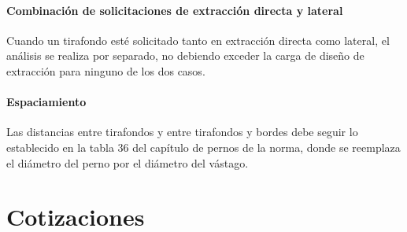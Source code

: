 \subsubsection{Combinación de solicitaciones de extracción directa y lateral}
Cuando un tirafondo esté solicitado tanto en extracción directa como lateral, el análisis se realiza por separado, no debiendo exceder la carga de diseño de extracción para ninguno de los dos casos.

\subsubsection{Espaciamiento}
Las distancias entre tirafondos y entre tirafondos y bordes debe seguir lo establecido en la tabla 36 del capítulo de pernos de la norma, donde se reemplaza el diámetro del perno por el diámetro del vástago.






\chapter{Cotizaciones}
